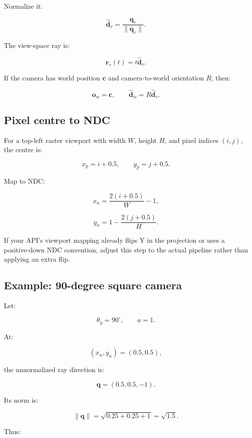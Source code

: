 Normalize it:

\[ \boxed{ \hat{\mathbf d}_v= \frac{\mathbf q_v}{\|\mathbf q_v\|}. } \]

The view-space ray is:

\[ \boxed{ \mathbf r_v(t)=t\hat{\mathbf d}_v. } \]

If the camera has world position \(\mathbf c\) and camera-to-world orientation \(R\), then:

\[ \boxed{ \mathbf o_w=\mathbf c, \qquad \hat{\mathbf d}_w=R\hat{\mathbf d}_v. } \]

\subsection{Pixel centre to NDC}\label{02-foundations-ii-ch035-pixel-centre-to-ndc}

For a top-left raster viewport with width \(W\), height \(H\), and pixel indices \((i,j)\), the centre is:

\[ x_p=i+0.5, \qquad y_p=j+0.5. \]

Map to NDC:

\[ \boxed{ x_n=\frac{2(i+0.5)}W-1, } \]

\[ \boxed{ y_n=1-\frac{2(j+0.5)}H. } \]

If your API's viewport mapping already flips Y in the projection or uses a positive-down NDC convention, adjust this step to the actual pipeline rather than applying an extra flip.

\begin{allmightroleexample}

\subsection{Example: 90-degree square camera}\label{02-foundations-ii-ch035-example-90-degree-square-camera}

Let:

\end{allmightroleexample}

\[ \theta_y=90^\circ,\qquad a=1. \]

At:

\[ (x_n,y_n)=(0.5,0.5), \]

the unnormalized ray direction is:

\[ \mathbf q=(0.5,0.5,-1). \]

Its norm is:

\[ \|\mathbf q\|= \sqrt{0.25+0.25+1} =\sqrt{1.5}. \]

Thus:

